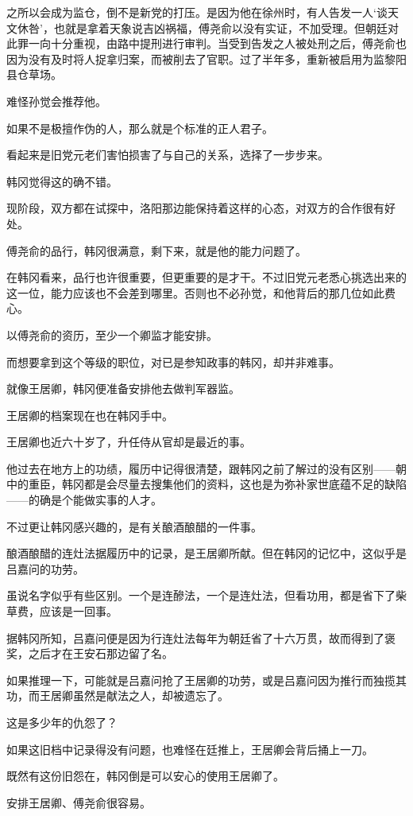 之所以会成为监仓，倒不是新党的打压。是因为他在徐州时，有人告发一人‘谈天文休咎’，也就是拿着天象说吉凶祸福，傅尧俞以没有实证，不加受理。但朝廷对此罪一向十分重视，由路中提刑进行审判。当受到告发之人被处刑之后，傅尧俞也因为没有及时将人捉拿归案，而被削去了官职。过了半年多，重新被启用为监黎阳县仓草场。

难怪孙觉会推荐他。

如果不是极擅作伪的人，那么就是个标准的正人君子。

看起来是旧党元老们害怕损害了与自己的关系，选择了一步步来。

韩冈觉得这的确不错。

现阶段，双方都在试探中，洛阳那边能保持着这样的心态，对双方的合作很有好处。

傅尧俞的品行，韩冈很满意，剩下来，就是他的能力问题了。

在韩冈看来，品行也许很重要，但更重要的是才干。不过旧党元老悉心挑选出来的这一位，能力应该也不会差到哪里。否则也不必孙觉，和他背后的那几位如此费心。

以傅尧俞的资历，至少一个卿监才能安排。

而想要拿到这个等级的职位，对已是参知政事的韩冈，却并非难事。

就像王居卿，韩冈便准备安排他去做判军器监。

王居卿的档案现在也在韩冈手中。

王居卿也近六十岁了，升任侍从官却是最近的事。

他过去在地方上的功绩，履历中记得很清楚，跟韩冈之前了解过的没有区别——朝中的重臣，韩冈都是会尽量去搜集他们的资料，这也是为弥补家世底蕴不足的缺陷——的确是个能做实事的人才。

不过更让韩冈感兴趣的，是有关酿酒酿醋的一件事。

酿酒酿醋的连灶法据履历中的记录，是王居卿所献。但在韩冈的记忆中，这似乎是吕嘉问的功劳。

虽说名字似乎有些区别。一个是连醦法，一个是连灶法，但看功用，都是省下了柴草费，应该是一回事。

据韩冈所知，吕嘉问便是因为行连灶法每年为朝廷省了十六万贯，故而得到了褒奖，之后才在王安石那边留了名。

如果推理一下，可能就是吕嘉问抢了王居卿的功劳，或是吕嘉问因为推行而独揽其功，而王居卿虽然是献法之人，却被遗忘了。

这是多少年的仇怨了？

如果这旧档中记录得没有问题，也难怪在廷推上，王居卿会背后捅上一刀。

既然有这份旧怨在，韩冈倒是可以安心的使用王居卿了。

安排王居卿、傅尧俞很容易。

